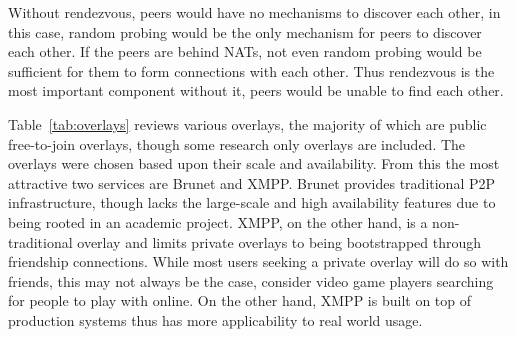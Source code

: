 \documentclass[conference]{IEEEtran}
\begin{document}
Without rendezvous, peers would have no mechanisms to discover each other, in
this case, random probing would be the only mechanism for peers to discover
each other.  If the peers are behind NATs, not even random probing would be
sufficient for them to form connections with each other.  Thus rendezvous is
the most important component without it, peers would be unable to find each
other.

Table~\ref{tab:overlays} reviews various overlays, the majority of which are
public free-to-join overlays, though some research only overlays are included.
The overlays were chosen based upon their scale and availability.  From this
the most attractive two services are Brunet and XMPP.  Brunet provides
traditional P2P infrastructure, though lacks the large-scale and high
availability features due to being rooted in an academic project.  XMPP,
on the other hand, is a non-traditional overlay and limits private overlays
to being bootstrapped through friendship connections.  While most users
seeking a private overlay will do so with friends, this may not always be the
case, consider video game players searching for people to play with online.
On the other hand, XMPP is built on top of production systems thus has
more applicability to real world usage.
\end{document}
